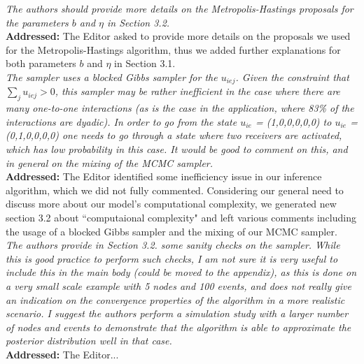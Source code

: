 \documentclass[12pt]{article}
\newcommand{\grey}[1]{{\color{mygrey}#1}}
\theoremstyle{definition}
\begin{document}
 \grey{\emph{The authors should provide more details on the Metropolis-Hastings
proposals for the parameters $b$ and $\eta$ in Section 3.2. }}\\

\noindent \textcolor{MyGreen}{\textbf{Addressed:}} The Editor asked to provide more details on the proposals we used for the Metropolis-Hastings algorithm, thus we added further explanations for both parameters $b$ and $\eta$ in Section 3.1.\\


 \grey{\emph{The sampler uses a blocked Gibbs sampler for the $u_{iej}$. Given the constraint that $\sum_j u_{iej} > 0$, this sampler may be rather inefficient in the case where there are many one-to-one interactions (as is the case in the application, where 83\% of the interactions are dyadic). In order to go from the state $u_{ie}$ = (1,0,0,0,0,0) to $u_{ie}$ = (0,1,0,0,0,0) one needs to go through a state where two receivers are activated, which has low probability in this case. It would be good to comment on this, and in general on the mixing of the MCMC sampler. }}\\

\noindent \textcolor{MyGreen}{\textbf{Addressed:}} The Editor identified some inefficiency issue in our inference algorithm, which we did not fully commented. Considering our general need to discuss more about our model's computational complexity, we generated new section 3.2 about ``computaional complexity" and left various comments including the usage of a blocked Gibbs sampler and the mixing of our MCMC sampler.\\


 \grey{\emph{The authors provide in Section 3.2. some sanity checks on the sampler. While this is good practice to perform such checks, I am not sure it is very useful to include this in the main body (could be moved to the appendix), as this is done on a very small scale example with 5 nodes and 100 events, and does not really give an indication on the convergence properties of the algorithm in a more realistic scenario. I suggest the authors perform a simulation study with a larger number of nodes and events to demonstrate that the algorithm is able to approximate the posterior distribution well in that case.
}}\\

\noindent \textcolor{MyGreen}{\textbf{Addressed:}} The Editor... \\
\end{document}
